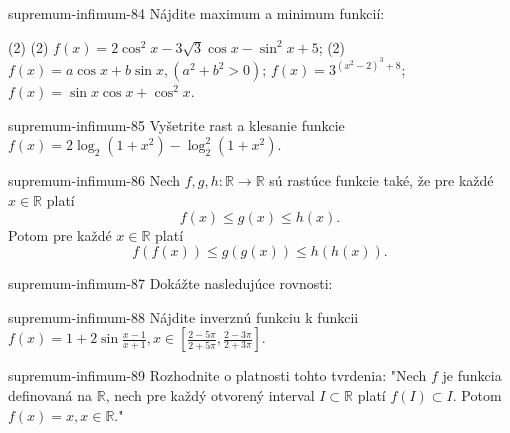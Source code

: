 \begin{defproblem}{supremum-infimum-84}
Nájdite maximum a minimum funkcií:
\begin{tasks}(2)
  \task*(2) $f(x)=2\cos^2 x -3\sqrt{3}\cos x -\sin^2 x +5$;
  \task*(2) $f(x)=a\cos x +b\sin x ,(a^2+b^2>0)$;
  \task $f(x)=3^{(x^2-2)^3+8}$;
  \task $f(x)=\sin x \cos x +\cos^2 x$.
\end{tasks}
\end{defproblem}

\begin{defproblem}{supremum-infimum-85}
Vyšetrite rast a klesanie funkcie $f(x)=2\log_2(1+x^2)-\log_2^2(1+x^2)$.
\end{defproblem}

\begin{defproblem}{supremum-infimum-86}
Nech $f,g,h:\mathbb{R}\rightarrow\mathbb{R}$ sú rastúce funkcie také, že pre každé $x\in\mathbb{R}$ platí $$f(x)\leq g(x)\leq h(x).$$
Potom pre každé $x\in\mathbb{R}$ platí $$f(f(x))\leq g(g(x))\leq h(h(x)).$$
\end{defproblem}

\begin{defproblem}{supremum-infimum-87}
Dokážte nasledujúce rovnosti:
\end{defproblem}

\begin{defproblem}{supremum-infimum-88}
Nájdite inverznú funkciu k funkcii $f(x)=1+2\sin\frac{x-1}{x+1},x\in[\frac{2-5\pi}{2+5\pi},\frac{2-3\pi}{2+3\pi}]$.
\end{defproblem}

\begin{defproblem}{supremum-infimum-89}
Rozhodnite o platnosti tohto tvrdenia: "Nech $f$ je funkcia definovaná na $\mathbb{R}$, nech pre každý otvorený interval $I\subset\mathbb{R}$ platí $f(I)\subset I$. Potom $f(x)=x,x\in\mathbb{R}$."
\end{defproblem}